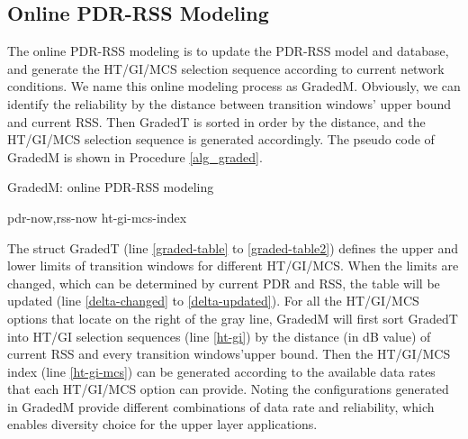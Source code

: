 \documentclass[draftclsnofoot,journal,onecolumn,11pt]{IEEEtran}
\begin{document}
\subsection{Online PDR-RSS Modeling}
The online PDR-RSS modeling is to update the PDR-RSS model and database, and generate the HT/GI/MCS selection sequence according to current network conditions. We name this online modeling process as GradedM. Obviously, we can identify the reliability by the distance between transition windows' upper bound and current RSS. Then GradedT is sorted in order by the distance, and the HT/GI/MCS selection sequence is generated accordingly. The pseudo code of GradedM is shown in Procedure \ref{alg_graded}.
\begin{algorithm}[!t]
\renewcommand{\algorithmicrequire}{\textbf{Input:}}
\renewcommand{\algorithmicensure}{\textbf{Output:}}
\caption{GradedM: online PDR-RSS modeling}
\label{alg_graded}
\begin{algorithmic}[1]
\Require pdr-now,rss-now
\Ensure  ht-gi-mcs-index
 \label{delta-changed}
\EndIf \label{delta-updated}
 \label{ht-gi}
 \label{ht-gi-mcs}
\State {}
\end{algorithmic}
\end{algorithm}

The struct GradedT (line \ref{graded-table} to \ref{graded-table2}) defines the upper and lower limits of transition windows for different HT/GI/MCS. When the limits are changed, which can be determined by current PDR and RSS, the table will be updated (line \ref{delta-changed} to \ref{delta-updated}). For all the HT/GI/MCS options that locate on the right of the gray line, GradedM will first sort GradedT into HT/GI selection sequences (line \ref{ht-gi}) by the distance (in dB value) of current RSS and every transition windows\rq upper bound. Then the HT/GI/MCS index (line \ref{ht-gi-mcs}) can be generated according to the available data rates that each HT/GI/MCS option can provide. Noting the configurations generated in GradedM provide different combinations of data rate and reliability, which enables diversity choice for the upper layer applications.
\end{document}
